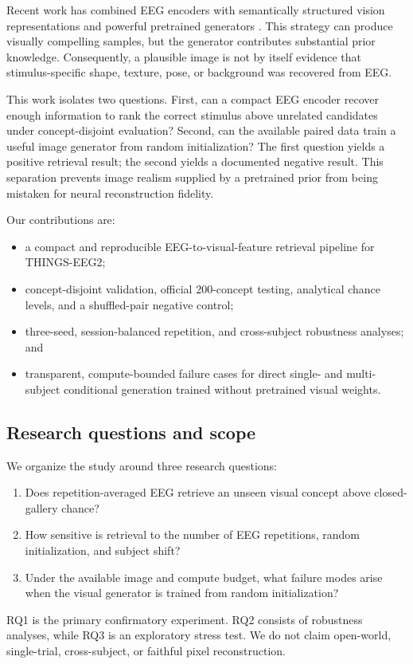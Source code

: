 \documentclass[10pt]{article}
\begin{document}
Recent work has combined EEG encoders with semantically structured vision
representations and powerful pretrained generators
\cite{song2024nice,li2024visual_decoding,bai2024dreamdiffusion}. This strategy
can produce visually compelling samples, but the generator contributes
substantial prior knowledge. Consequently, a plausible image is not by itself
evidence that stimulus-specific shape, texture, pose, or background was
recovered from EEG.

This work isolates two questions. First, can a compact EEG encoder recover
enough information to rank the correct stimulus above unrelated candidates
under concept-disjoint evaluation? Second, can the available paired data train
a useful image generator from random initialization? The first question yields
a positive retrieval result; the second yields a documented negative result.
This separation prevents image realism supplied by a pretrained prior from
being mistaken for neural reconstruction fidelity.

Our contributions are:
\begin{itemize}
  \item a compact and reproducible EEG-to-visual-feature retrieval pipeline for
  THINGS-EEG2;
  \item concept-disjoint validation, official 200-concept testing, analytical
  chance levels, and a shuffled-pair negative control;
  \item three-seed, session-balanced repetition, and cross-subject robustness
  analyses; and
  \item transparent, compute-bounded failure cases for direct single- and
  multi-subject conditional generation trained without pretrained visual
  weights.
\end{itemize}

\subsection{Research questions and scope}

We organize the study around three research questions:
\begin{enumerate}
  \item[\textbf{RQ1}] Does repetition-averaged EEG retrieve an unseen visual
  concept above closed-gallery chance?
  \item[\textbf{RQ2}] How sensitive is retrieval to the number of EEG
  repetitions, random initialization, and subject shift?
  \item[\textbf{RQ3}] Under the available image and compute budget, what
  failure modes arise when the visual generator is trained from random
  initialization?
\end{enumerate}
RQ1 is the primary confirmatory experiment. RQ2 consists of robustness
analyses, while RQ3 is an exploratory stress test. We do not claim open-world,
single-trial, cross-subject, or faithful pixel reconstruction.
\end{document}
